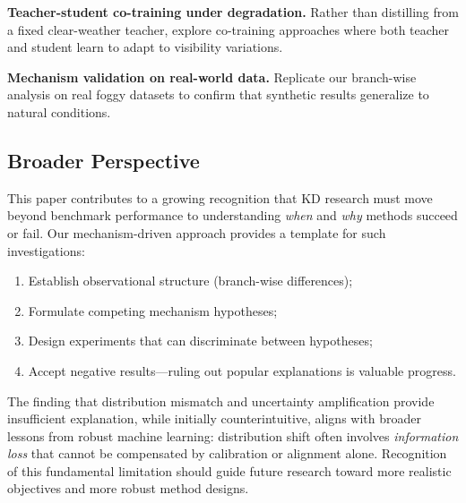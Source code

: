 \textbf{Teacher-student co-training under degradation.} Rather than distilling from a fixed clear-weather teacher, explore co-training approaches where both teacher and student learn to adapt to visibility variations.

\textbf{Mechanism validation on real-world data.} Replicate our branch-wise analysis on real foggy datasets to confirm that synthetic results generalize to natural conditions.

\subsection{Broader Perspective}

This paper contributes to a growing recognition that KD research must move beyond benchmark performance to understanding \emph{when} and \emph{why} methods succeed or fail. Our mechanism-driven approach provides a template for such investigations:
\begin{enumerate}
    \item Establish observational structure (branch-wise differences);
    \item Formulate competing mechanism hypotheses;
    \item Design experiments that can discriminate between hypotheses;
    \item Accept negative results---ruling out popular explanations is valuable progress.
\end{enumerate}

The finding that distribution mismatch and uncertainty amplification provide insufficient explanation, while initially counterintuitive, aligns with broader lessons from robust machine learning: distribution shift often involves \emph{information loss} that cannot be compensated by calibration or alignment alone. Recognition of this fundamental limitation should guide future research toward more realistic objectives and more robust method designs.
